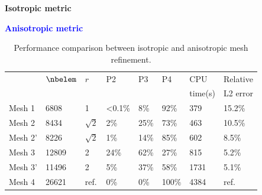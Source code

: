 \begin{frame}[noframenumbering]

  \begin{multicols}{2}
    \large{\textbf{\textcolor{\mygreen}{Isotropic metric}}}

    \columnbreak

    \large{\textbf{\textcolor{blue}{Anisotropic metric}}}

  \end{multicols}

  \begin{table}[H]
    \small
\centering
\begin{tabular}{|l|l|l|l|l|l|l|l|}
\hline
& $\nbelem$  & $r$  & P2 & P3 & P4 &  CPU & Relative  \\
&  & &  &  &  & time(s) & L2 error \\ \hline
Mesh 1 &6808 &  1           &  <0.1\% & 8\% &92\% & 379 & 15.2\% \\ \hline
\rowcolor{green!30}
Mesh 2 &8434 &  $\sqrt{2}$  & 2\% & 25\% & 73\% & 463 & 10.5\% \\ \hline
\rowcolor{blue!30}
Mesh 2'&8226 &  $\sqrt{2}$  & 1\% & 14\% & 85\% & 602 & 8.5\% \\ \hline
\rowcolor{green!30}
Mesh 3 &12809&  2           & 24\% &62\% & 27\% & 815 & 5.2\% \\ \hline
\rowcolor{blue!30}
Mesh 3'&11496&  2           & 5\% & 37\% & 58\% & 1731 & 5.1\%  \\ \hline
Mesh 4 &26621&  ref.        & 0\% & 0\% & 100\% & 4384 & ref. \\ \hline
\end{tabular}
\caption{Performance comparison between isotropic and anisotropic mesh refinement.}
\label{mesh_iso_aniso_comp}
\end{table}
  \end{frame}



